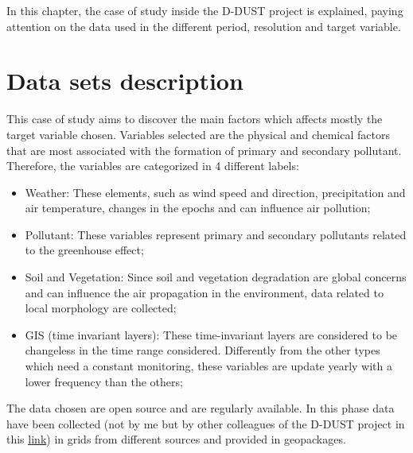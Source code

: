 In this chapter, the case of study inside the D-DUST project is explained, paying attention on the data used in the different period, resolution and target variable. 

\section{Data sets description}
This case of study aims to discover the main factors which affects mostly the target variable chosen. 
Variables selected are the physical and chemical factors that are most associated with the formation of primary and secondary pollutant. \newline
Therefore, the variables are categorized in 4 different labels:
\begin{itemize}
\item Weather: These elements, such as wind speed and direction, precipitation and air temperature, changes in the epochs and can influence air pollution;
\item Pollutant: These variables represent primary and secondary pollutants related to the greenhouse effect;
\item Soil and Vegetation: Since soil and vegetation degradation are global concerns and can influence the air propagation in the environment, data related to local morphology are collected;
\item GIS (time invariant layers): These time-invariant layers are considered to be changeless in the time range considered. Differently from the other types which need a constant monitoring, these variables are update yearly with a lower frequency than the others;
\end{itemize}
The data chosen are open source and are regularly available.
In this phase data have been collected (not by me but by other colleagues of the D-DUST project in this \underline{ \href{https://docs.google.com/spreadsheets/d/1-5pwMSc1QlFyC8iIaA-l1fWhWtpqVio2/edit\#gid=91313358} link}) in grids from different sources and provided in geopackages. 
